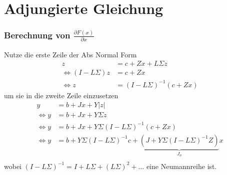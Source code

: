 \section[Adjungierte Gleichung]{Adjungierte Gleichung}

\begin{frame}[<+->]
\frametitle{Berechnung von $\frac{\partial F(x)}{\partial x}$}
Nutze die erste Zeile der Abs Normal Form
\begin{align*}
z &= c+Zx + L\Sigma z \\
\iff (I-L\Sigma)z &= c+Zx  \\
\iff z &= (I-L\Sigma)^{-1}(c+Zx) 
\end{align*}
\pause
um sie in die zweite Zeile einzusetzen
\begin{align*}
y &= b+ Jx + Y|z| \\
\iff y &= b+ Jx + Y\Sigma z \\
\iff y &= b+ Jx + Y\Sigma (I-L\Sigma)^{-1}(c+Zx) \\
\iff y &= b+  Y\Sigma (I-L\Sigma)^{-1}c + \underbrace{(J + Y\Sigma (I-L\Sigma)^{-1}Z)}_{J_\sigma} x \\
\end{align*}
wobei $(I-L\Sigma)^{-1} = I +L\Sigma + (L\Sigma)^2+\ldots$ eine Neumannreihe ist.
\end{frame}

